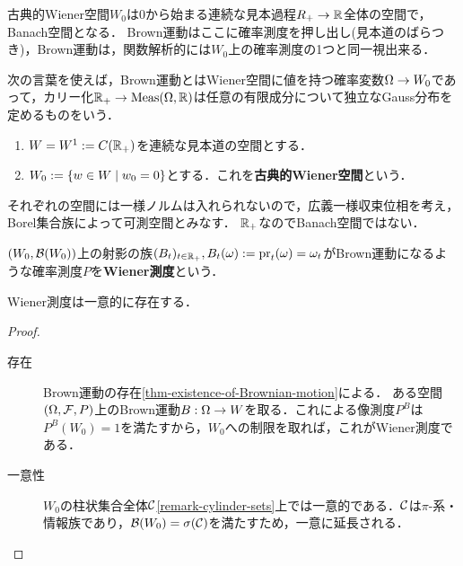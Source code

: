 \documentclass[uplatex,dvipdfmx]{jsreport}
\begin{document}
\begin{tcolorbox}[colframe=ForestGreen, colback=ForestGreen!10!white,breakable,colbacktitle=ForestGreen!40!white,coltitle=black,fonttitle=\bfseries\sffamily,
title=]
    古典的Wiener空間$W_0$は$0$から始まる連続な見本過程$R_+\to\mathbb{R}$全体の空間で，Banach空間となる．
    Brown運動はここに確率測度を押し出し(見本道のばらつき)，Brown運動は，関数解析的には$W_0$上の確率測度の1つと同一視出来る．
\end{tcolorbox}

\begin{notation}
    次の言葉を使えば，Brown運動とはWiener空間に値を持つ確率変数$\Omega\to W_0$であって，カリー化$\mathbb{R}_+\to\mathrm{Meas}(\Omega,\mathbb{R})$は任意の有限成分について独立なGauss分布を定めるものをいう．
    \begin{enumerate}
        \item $W=W^1:=C(\mathbb{R}_+)$を連続な見本道の空間とする．
        \item $W_0:=\left\{w\in W\mid w_0=0\right\}$とする．これを\textbf{古典的Wiener空間}という．
    \end{enumerate}
    それぞれの空間には一様ノルムは入れられないので，広義一様収束位相を考え，Borel集合族によって可測空間とみなす．
    $\mathbb{R}_+$なのでBanach空間ではない．
\end{notation}

\begin{definition}
    $(W_0,\mathcal{B}(W_0))$上の射影の族$(B_t)_{t\in\mathbb{R}_+},B_t(\omega):=\mathrm{pr}_t(\omega)=\omega_t$がBrown運動になるような確率測度$P$を\textbf{Wiener測度}という．
\end{definition}

\begin{lemma}
    Wiener測度は一意的に存在する．
\end{lemma}
\begin{proof}\mbox{}
    \begin{description}
        \item[存在] Brown運動の存在\ref{thm-existence-of-Brownian-motion}による．
        ある空間$(\Omega,\mathcal{F},P)$上のBrown運動$B:\Omega\to W$を取る．これによる像測度$P^B$は$P^B(W_0)=1$を満たすから，$W_0$への制限を取れば，これがWiener測度である．
        \item[一意性] $W_0$の柱状集合全体$\mathcal{C}$\ref{remark-cylinder-sets}上では一意的である．$\mathcal{C}$は$\pi$-系・情報族であり，$\mathcal{B}(W_0)=\sigma(\mathcal{C})$を満たすため，一意に延長される．
    \end{description}
\end{proof}
\end{document}
